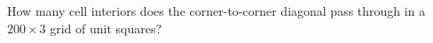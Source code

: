 How many cell interiors does the corner-to-corner diagonal pass through in a $200\times3$ grid of unit squares?

